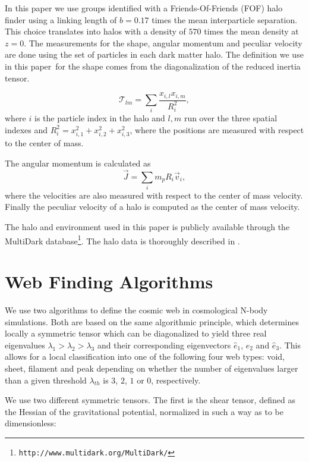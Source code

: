 \documentclass[useAMS,usenatbib]{mn2e}
\newcommand{\documentname}{paper~}
\begin{document}
In this paper we use groups identified with a Friends-Of-Friends (FOF) halo
finder using a linking length of $b=0.17$ times the mean interparticle
separation. This choice translates into halos with a density of $570$
times the mean density at $z=0$. The measurements for the shape,
angular momentum and peculiar velocity are done using the set of
particles in each dark matter halo. The definition we use in this
\documentname for the shape comes from the diagonalization of the
reduced inertia tensor.

\begin{equation}
{\mathcal T}_{lm} = \sum_{i}\frac{x_{i,l}x_{i,m}}{R_i^2},
\end{equation}
where $i$ is the particle index in the halo and $l,m$ run over the
three spatial indexes  and $R_i^2 = x_{i,1}^2 + x_{i,2}^2 +
x_{i,3}^2$, where the positions are measured with respect to the
center of mass.

The angular momentum is calculated as
\begin{equation}
\vec{J} = \sum_{i}m_p{R_i}\vec{v}_i,
\end{equation}
where the velocities are also measured with respect to the center of
mass velocity. Finally the peculiar velocity of a halo is computed as
the center of mass velocity.

The halo and environment used in this paper is publicly available through the
MultiDark database\footnote{\texttt{http://www.multidark.org/MultiDark/}}. The
halo data is thoroughly described in \cite{2013AN....334..691R}.



\section{Web Finding Algorithms}
\label{sec:algorithms}

We use two algorithms to define the cosmic web in cosmological N-body
simulations. Both are based on the same algorithmic principle, which
determines locally a symmetric tensor which can be diagonalized to yield
three real eigenvalues $\lambda_1>\lambda_2>\lambda_3$ and their
corresponding eigenvectors $\hat{e}_{1}$, $\hat{e}_2$ and
$\hat{e}_3$. This allows for a local classification into one of the 
following four web types: void, sheet, filament and peak depending
on whether the number of eigenvalues larger than a given threshold
$\lambda_{th}$ is $3$, $2$, $1$ or $0$, respectively.

We use two different symmetric tensors. The first is the shear tensor,
defined as the Hessian of the gravitational potential, normalized in
such a way as to be dimensionless:
\end{document}
